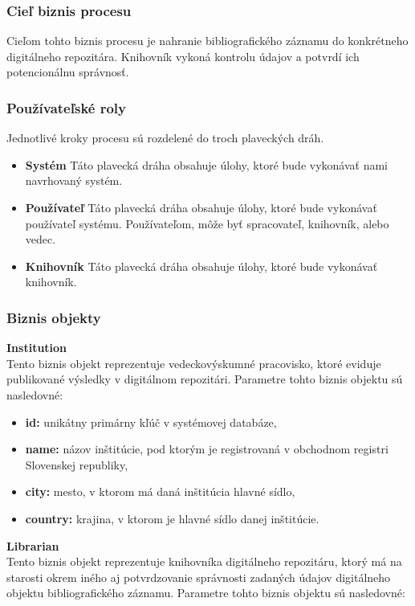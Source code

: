 \documentclass[10pt,oneside,slovak,a4paper]{article}
\begin{document}
\subsubsection{Cieľ biznis procesu}
Cieľom tohto biznis procesu je nahranie bibliografického záznamu do konkrétneho digitálneho repozitára. Knihovník vykoná kontrolu údajov a potvrdí ich potencionálnu správnosť.

\subsubsection{Používateľské roly}
Jednotlivé kroky procesu sú rozdelené do troch plaveckých dráh.

\begin{itemize}
\item \textbf{Systém} Táto plavecká dráha obsahuje úlohy, ktoré bude vykonávať nami navrhovaný systém.
\item \textbf{Používateľ} Táto plavecká dráha obsahuje úlohy, ktoré bude vykonávať používateľ systému. Používateľom, môže byť spracovateľ, knihovník, alebo vedec.
\item \textbf{Knihovník} Táto plavecká dráha obsahuje úlohy, ktoré bude vykonávať knihovník.
\end{itemize}

\newpage

\subsubsection{Biznis objekty}
\textbf{Institution}\\
Tento biznis objekt reprezentuje vedeckovýskumné pracovisko, ktoré eviduje publikované výsledky v digitálnom repozitári. Parametre tohto biznis objektu sú nasledovné:

\begin{itemize}
\item \textbf{id:} unikátny primárny kľúč v systémovej databáze,
\item \textbf{name:} názov inštitúcie, pod ktorým je registrovaná v obchodnom registri Slovenskej republiky,
\item \textbf{city:} mesto, v ktorom má daná inštitúcia hlavné sídlo,
\item \textbf{country:} krajina, v ktorom je hlavné sídlo danej inštitúcie.
\end{itemize}

\textbf{Librarian}\\
Tento biznis objekt reprezentuje knihovníka digitálneho repozitáru, ktorý má na starosti okrem iného aj potvrdzovanie správnosti zadaných údajov digitálneho objektu bibliografického záznamu. Parametre tohto biznis objektu sú nasledovné:
\end{document}
